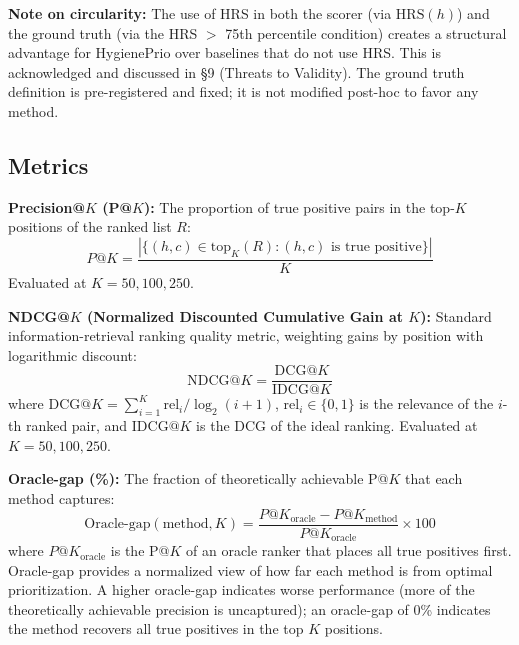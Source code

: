 \textbf{Note on circularity:} The use of HRS in both the scorer (via $\mathrm{HRS}(h)$) and the ground truth (via the HRS $>$ 75th percentile condition) creates a structural advantage for HygienePrio over baselines that do not use HRS. This is acknowledged and discussed in \S9 (Threats to Validity). The ground truth definition is pre-registered and fixed; it is not modified post-hoc to favor any method.

\subsection{Metrics}

\textbf{Precision@$K$ (P@$K$):} The proportion of true positive pairs in the top-$K$ positions of the ranked list $R$:
\[
 P@K = \frac{|\{(h,c) \in \mathrm{top}_K(R) : (h,c) \text{ is true positive}\}|}{K}
\]
Evaluated at $K = 50, 100, 250$.

\textbf{NDCG@$K$ (Normalized Discounted Cumulative Gain at $K$):} Standard information-retrieval ranking quality metric, weighting gains by position with logarithmic discount:
\[
 \mathrm{NDCG}@K = \frac{\mathrm{DCG}@K}{\mathrm{IDCG}@K}
\]
where $\mathrm{DCG}@K = \sum_{i=1}^{K} \mathrm{rel}_i / \log_2(i+1)$, $\mathrm{rel}_i \in \{0,1\}$ is the relevance of the $i$-th ranked pair, and $\mathrm{IDCG}@K$ is the DCG of the ideal ranking. Evaluated at $K = 50, 100, 250$.

\textbf{Oracle-gap (\%):} The fraction of theoretically achievable P@$K$ that each method captures:
\[
 \mathrm{Oracle\text{-}gap}(\text{method}, K) = \frac{P@K_{\mathrm{oracle}} - P@K_{\mathrm{method}}}{P@K_{\mathrm{oracle}}} \times 100
\]
where $P@K_{\mathrm{oracle}}$ is the P@$K$ of an oracle ranker that places all true positives first. Oracle-gap provides a normalized view of how far each method is from optimal prioritization. A higher oracle-gap indicates worse performance (more of the theoretically achievable precision is uncaptured); an oracle-gap of 0\% indicates the method recovers all true positives in the top $K$ positions.
